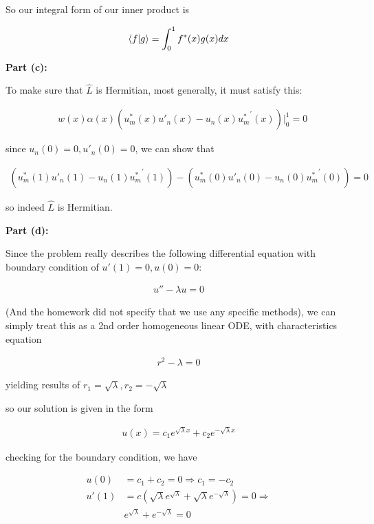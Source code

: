 \documentclass{article}
\numberwithin{equation}{section}
\begin{document}
So our integral form of our inner product is

\begin{align}
    \bra{f} \ket{g} = \int_{0}^{1} f^*(x) g(x) dx
\end{align}

\textbf{Part (c):}

To make sure that $\hat{L}$ is Hermitian, most generally, it must satisfy this:

\begin{align}
    & w(x) \alpha(x) (u^*_m (x) u'_n(x) - u_n(x) {u^*_m}^{'} (x))  \rvert_{0}^{1} = 0
\end{align}

since $u_n (0) = 0, u'_n(0) = 0$, we can show that

\begin{align}
    ( u^*_m (1) u'_n (1) - u_n (1) {u^*_m}^{'} (1))- ( u^*_m (0) u'_n (0) - u_n (0) {u^*_m}^{'} (0)) = 0
\end{align}

so indeed $\hat{L}$ is Hermitian.

\textbf{Part (d):}

Since the problem really describes the following differential equation with boundary condition of $u'(1) = 0, u(0) = 0$:

\begin{align}
    u'' - \lambda u = 0
\end{align}

(And the homework did not specify that we use any specific methods), we can simply treat this as a 2nd order homogeneous linear ODE, with characteristics equation

\begin{align}
    r^2 - \lambda = 0 
\end{align}

yielding results of $r_1 = \sqrt{\lambda}, r_2 = -\sqrt{\lambda}$

so our solution is given in the form

\begin{align}
    u(x) = c_1 e^{\sqrt{\lambda}x} + c_2 e^{-\sqrt{\lambda}x}
\end{align}

checking for the boundary condition, we have

\begin{align}
    u(0) &= c_1 + c_2 = 0 \Rightarrow c_1 = - c_2 \\
    u'(1) &= c (\sqrt{\lambda}e^{\sqrt{\lambda}} + \sqrt{\lambda}e^{-\sqrt{\lambda}}) = 0 \Rightarrow  \\
    &e^{\sqrt{\lambda}} + e^{-\sqrt{\lambda}} = 0
\end{align}
\end{document}
